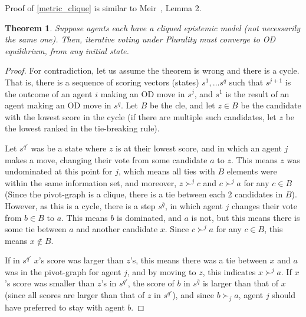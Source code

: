 \documentclass[letterpaper]{article} %
\newtheorem{theorem}{Theorem}
\begin{document}
Proof of \ref{metric_clique} is similar to Meir~, Lemma 2.

\begin{theorem}
Suppose agents each have a cliqued epistemic model (not necessarily the same one). Then, iterative voting under Plurality must converge to OD equilibrium, from any initial state.
\end{theorem}
\begin{proof}
For contradiction, let us assume the theorem is wrong and there is a cycle. That is, there is a sequence of scoring vectors (states) ${s}^{1},\ldots {s}^{q}$ such that ${s}^{j+1}$ is the outcome of an agent $i$ making an OD move in ${s}^{j}$, and ${s}^{1}$ is the result of an agent making an OD move in ${s}^{q}$. Let $B$ be the cle, and let $z\in B$ be the candidate with the lowest score in the cycle (if there are multiple such candidates, let $z$ be the lowest ranked in the tie-breaking rule).

Let ${s}^{q'}$ was be a state where $z$ is at their lowest score, and in which an agent $j$ makes a move, changing their vote from some candidate $a$ to $z$. This means $z$ was undominated at this point for $j$, which means all ties with $B$ elements were within the same information set, and moreover, $z\succ^{j}c$ and $c\succ^{j}a$ for any $c\in B$ (Since the pivot-graph is a clique, there is a tie between each 2 candidates in $B$). However, as this is a cycle, there is a step ${s}^{\bar{q}}$, in which agent $j$ changes their vote from $b\in B$ to $a$. This means $b$ is dominated, and $a$ is not, but this means there is some tie between $a$ and another candidate $x$. Since $c\succ^{j} a$ for any $c\in B$, this means $x\notin B$.

If in ${s}^{q'}$ $x$'s score was larger than $z$'s, this means there was a tie between $x$ and $a$ was in the pivot-graph for agent $j$, and by moving to $z$, this indicates $x\succ^{j} a$. If $x$'s score was smaller than $z$'s in ${s}^{q'}$, the score of $b$ in ${s}^{\bar{q}}$ is larger than that of $x$ (since all scores are larger than that of $z$ in ${s}^{q'}$), and since $b\succ_{j}a$, agent $j$ should have preferred to stay with agent $b$.
\end{proof}
\end{document}
